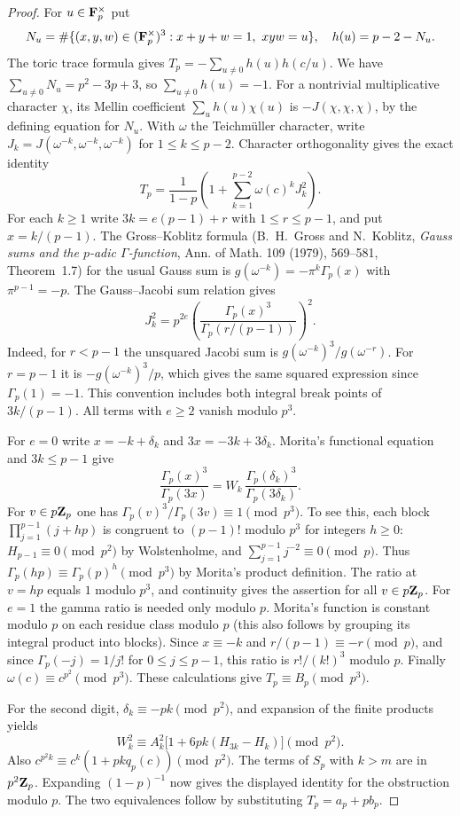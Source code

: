 \documentclass[11pt,letterpaper]{article}
\theoremstyle{definition}
\theoremstyle{remark}
\begin{document}
\begin{proof}
For $u\in\mathbf F_p^\times$ put
\[
 N_u=\#\{(x,y,w)\in(\F_p^\times)^3:x+y+w=1,\ xyw=u\},\quad h(u)=p-2-N_u.
\]
The toric trace formula gives $T_p=-\sum_{u\ne0}h(u)h(c/u)$.
We have $\sum_{u\ne0}N_u=p^2-3p+3$, so $\sum_{u\ne0}h(u)=-1$.
For a nontrivial multiplicative character $\chi$, its Mellin coefficient
$\sum_u h(u)\chi(u)$ is $-J(\chi,\chi,\chi)$, by the defining equation for $N_u$.
With $\omega$ the Teichm\"uller character, write
$J_k=J(\omega^{-k},\omega^{-k},\omega^{-k})$ for $1\le k\le p-2$.
Character orthogonality gives the exact identity
\[
 T_p=\frac1{1-p}\left(1+\sum_{k=1}^{p-2}\omega(c)^k J_k^2\right).
\]
For each $k\ge1$ write $3k=e(p-1)+r$ with $1\le r\le p-1$, and put
$x=k/(p-1)$. The Gross--Koblitz formula (B.~H.~Gross and N.~Koblitz,
\emph{Gauss sums and the $p$-adic $\Gamma$-function}, Ann. of Math.
109 (1979), 569--581, Theorem~1.7)
for the usual Gauss sum is $g(\omega^{-k})=-\pi^k\Gamma_p(x)$ with $\pi^{p-1}=-p$.
The Gauss--Jacobi sum relation gives
\[
 J_k^2=p^{2e}\left(\frac{\Gamma_p(x)^3}{\Gamma_p(r/(p-1))}\right)^{\!2}.
\]
Indeed, for $r<p-1$ the unsquared Jacobi sum is $g(\omega^{-k})^3/g(\omega^{-r})$.
For $r=p-1$ it is $-g(\omega^{-k})^3/p$, which gives the same squared expression since
$\Gamma_p(1)=-1$. This convention includes both integral break points of $3k/(p-1)$.
All terms with $e\ge2$ vanish modulo $p^3$.

For $e=0$ write $x=-k+\delta_k$ and $3x=-3k+3\delta_k$. Morita's functional equation and $3k\le p-1$ give
\[
 \frac{\Gamma_p(x)^3}{\Gamma_p(3x)}=W_k\,\frac{\Gamma_p(\delta_k)^3}{\Gamma_p(3\delta_k)}.
\]
For $v\in p\mathbf Z_p$ one has $\Gamma_p(v)^3/\Gamma_p(3v)\equiv1\pmod{p^3}$.
To see this, each block $\prod_{j=1}^{p-1}(j+hp)$ is congruent to $(p-1)!$ modulo $p^3$ for integers $h\ge0$:
$H_{p-1}\equiv0\pmod{p^2}$ by Wolstenholme, and $\sum_{j=1}^{p-1}j^{-2}\equiv0\pmod p$.
Thus $\Gamma_p(hp)\equiv\Gamma_p(p)^h\pmod{p^3}$ by Morita's product definition.
The ratio at $v=hp$ equals $1$ modulo $p^3$, and continuity gives the assertion for all $v\in p\mathbf Z_p$.
For $e=1$ the gamma ratio is needed only modulo $p$. Morita's function is constant modulo $p$ on each residue class modulo $p$ (this also follows by grouping its integral product into blocks).
Since $x\equiv-k$ and $r/(p-1)\equiv-r\pmod p$, and since
$\Gamma_p(-j)=1/j!$ for $0\le j\le p-1$, this ratio is $r!/(k!)^3$ modulo $p$.
Finally $\omega(c)\equiv c^{p^2}\pmod{p^3}$. These calculations give $T_p\equiv B_p\pmod{p^3}$.

For the second digit, $\delta_k\equiv-pk\pmod {p^2}$, and expansion of the finite products yields
\[
 W_k^2\equiv A_k^2\bigl[1+6pk(H_{3k}-H_k)\bigr]\pmod {p^2}.
\]
Also $c^{p^2 k}\equiv c^k(1+pk q_p(c))\pmod{p^2}$. The terms of $S_p$ with $k>m$ are in $p^2\mathbf Z_p$.
Expanding $(1-p)^{-1}$ now gives the displayed identity for the obstruction modulo $p$. The two equivalences follow by substituting $T_p=a_p+p b_p$.
\end{proof}
\end{document}
